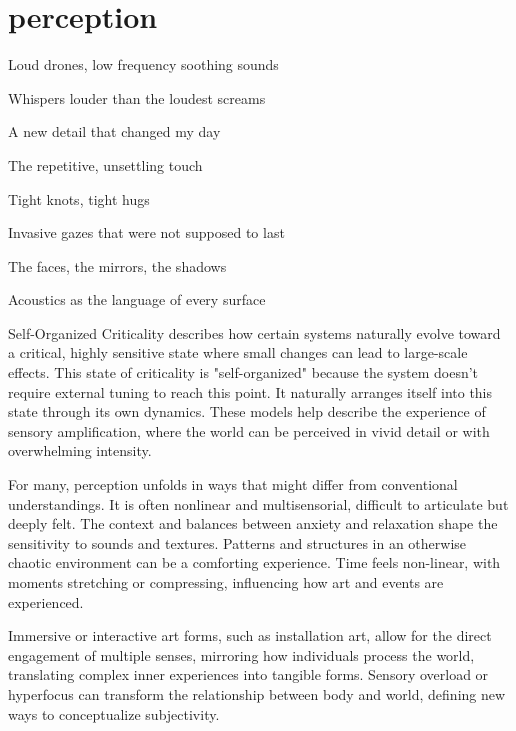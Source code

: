 \chapter*{perception}
\begin{center}
\vspace{2cm}
\begin{flushright}
Loud drones, low frequency soothing sounds

Whispers louder than the loudest screams

A new detail that changed my day

The repetitive, unsettling touch

Tight knots, tight hugs

Invasive gazes that were not supposed to last

The faces, the mirrors, the shadows

Acoustics as the language of every surface

\end{flushright}
\vspace{2cm}
\end{center}
\normalsize

Self-Organized Criticality describes how certain systems naturally evolve toward a critical, highly sensitive state where small changes can lead to large-scale effects. This state of criticality is "self-organized" because the system doesn't require external tuning to reach this point. It naturally arranges itself into this state through its own dynamics. These models help describe the experience of sensory amplification, where the world can be perceived in vivid detail or with overwhelming intensity. \citep{adami1993}

For many, perception unfolds in ways that might differ from conventional understandings. It is often nonlinear and multisensorial, difficult to articulate but deeply felt. The context and balances between anxiety and relaxation shape the sensitivity to sounds and textures. Patterns and structures in an otherwise chaotic environment can be a comforting experience. Time feels non-linear, with moments stretching or compressing, influencing how art and events are experienced.

Immersive or interactive art forms, such as installation art, allow for the direct engagement of multiple senses, mirroring how individuals process the world, translating complex inner experiences into tangible forms. Sensory overload or hyperfocus can transform the relationship between body and world, defining new ways to conceptualize subjectivity.

